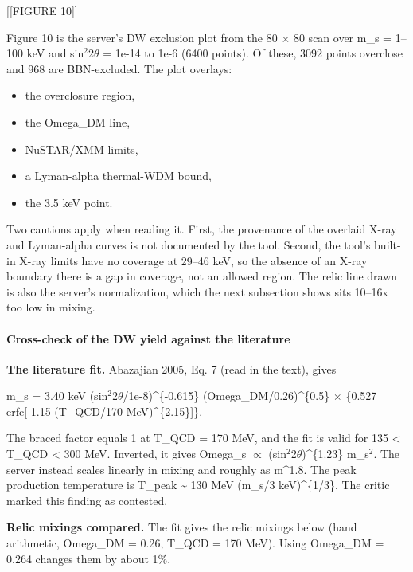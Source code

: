 \documentclass[11pt,a4paper]{article}
\begin{document}
[[FIGURE 10]]

Figure 10 is the server's DW exclusion plot from the 80 $\times$ 80 scan over m\_s = 1--100 keV and sin$^2$2$\theta$ = 1e-14 to 1e-6 (6400 points). Of these, 3092 points overclose and 968 are BBN-excluded. The plot overlays:

\begin{itemize}
  \item the overclosure region,
  \item the Omega\_DM line,
  \item NuSTAR/XMM limits,
  \item a Lyman-alpha thermal-WDM bound,
  \item the 3.5 keV point.
\end{itemize}
Two cautions apply when reading it. First, the provenance of the overlaid X-ray and Lyman-alpha curves is not documented by the tool. Second, the tool's built-in X-ray limits have no coverage at 29--46 keV, so the absence of an X-ray boundary there is a gap in coverage, not an allowed region. The relic line drawn is also the server's normalization, which the next subsection shows sits 10--16x too low in mixing.

\paragraph{Cross-check of the DW yield against the literature}
\textbf{The literature fit.} Abazajian 2005, Eq. 7 (read in the text), gives

m\_s = 3.40 keV (sin$^2$2$\theta$/1e-8)\textasciicircum{}\{-0.615\} (Omega\_DM/0.26)\textasciicircum{}\{0.5\} $\times$ \{0.527 erfc[-1.15 (T\_QCD/170 MeV)\textasciicircum{}\{2.15\}]\}.

The braced factor equals 1 at T\_QCD = 170 MeV, and the fit is valid for 135 \textless{} T\_QCD \textless{} 300 MeV. Inverted, it gives Omega\_s $\propto$ (sin$^2$2$\theta$)\textasciicircum{}\{1.23\} m\_s$^2$. The server instead scales linearly in mixing and roughly as m\textasciicircum{}1.8. The peak production temperature is T\_peak \textasciitilde{} 130 MeV (m\_s/3 keV)\textasciicircum{}\{1/3\}. The critic marked this finding as contested.

\textbf{Relic mixings compared.} The fit gives the relic mixings below (hand arithmetic, Omega\_DM = 0.26, T\_QCD = 170 MeV). Using Omega\_DM = 0.264 changes them by about 1\%.
\end{document}

